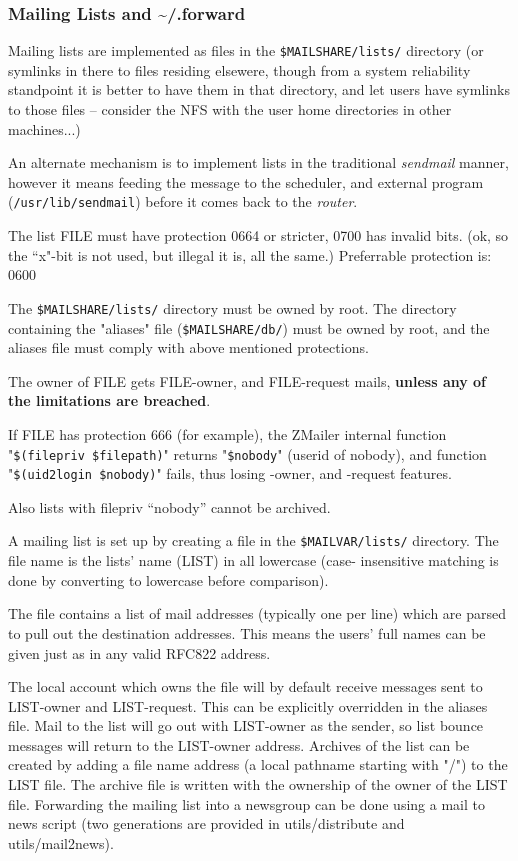 \subsubsection{Mailing Lists and \~{}/.forward \label{mailing_list_maintenance}}



Mailing lists are implemented as files in the {\tt \$MAILSHARE/lists/} 
directory (or symlinks in there to files residing elsewere, though from a system
reliability standpoint it is better to have them in that directory,
and let users have symlinks to those files -- consider the NFS
with the user home directories in other machines...)

An alternate mechanism is to implement lists in the traditional {\em sendmail\/}
manner, however it means feeding the message to the scheduler, and
external program ({\tt /usr/lib/sendmail}) before it comes back to the
{\em router\/}.

The list FILE must have protection 0664 or stricter, 0700 has invalid bits.
(ok, so the ``x"-bit is not used, but illegal it is, all the same.)
Preferrable protection is: 0600

The {\tt \$MAILSHARE/lists/} directory must be owned by root.
The directory containing the "aliases" file  ({\tt \$MAILSHARE/db/}) 
must be owned by root, and the aliases file must comply with above mentioned 
protections.

The owner of FILE gets FILE-owner, and FILE-request mails, {\bf unless any
of the limitations are breached}.

If FILE has protection 666 (for example), the ZMailer internal function
"{\tt \$(filepriv \$filepath)}" 
returns "{\tt \$nobody}" (userid of nobody), and  function
"{\tt \$(uid2login \$nobody)}" fails, thus losing -owner, and 
-request features.

Also lists with filepriv ``nobody'' cannot be archived.

A mailing list is set up by creating a file in the 
{\tt \$MAILVAR/lists/} directory.
The file name is the lists' name (LIST) in all lowercase (case-
insensitive matching is done by converting to lowercase before
comparison).

The file contains a list of mail addresses (typically one per line)
which are parsed to pull out the destination addresses.  This means
the users' full names can be given just as in any valid RFC822 address.

The local account which owns the file will by default receive messages
sent to LIST-owner and LIST-request.  This can be explicitly overridden
in the aliases file.  Mail to the list will go out with LIST-owner as
the sender, so list bounce messages will return to the LIST-owner
address.  Archives of the list can be created by adding a file name
address (a local pathname starting with "/") to the LIST file.  The
archive file is written with the ownership of the owner of the LIST
file.  Forwarding the mailing list into a newsgroup
can be done using a mail to news script (two generations are provided
in utils/distribute and utils/mail2news).




